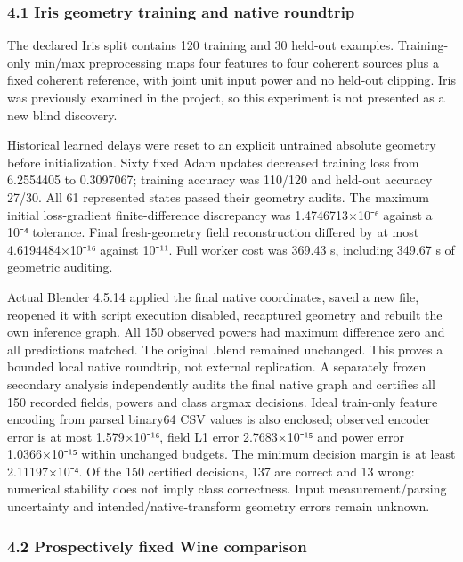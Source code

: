 \documentclass[
  10pt,
]{article}
\begin{document}
\hypertarget{iris-geometry-training-and-native-roundtrip}{%
\subsubsection{4.1 Iris geometry training and native
roundtrip}\label{iris-geometry-training-and-native-roundtrip}}

The declared Iris split contains 120 training and 30 held-out examples.
Training-only min/max preprocessing maps four features to four coherent
sources plus a fixed coherent reference, with joint unit input power and
no held-out clipping. Iris was previously examined in the project, so
this experiment is not presented as a new blind discovery.

Historical learned delays were reset to an explicit untrained absolute
geometry before initialization. Sixty fixed Adam updates decreased
training loss from 6.2554405 to 0.3097067; training accuracy was 110/120
and held-out accuracy 27/30. All 61 represented states passed their
geometry audits. The maximum initial loss-gradient finite-difference
discrepancy was 1.4746713×10⁻⁶ against a 10⁻⁴ tolerance. Final
fresh-geometry field reconstruction differed by at most 4.6194484×10⁻¹⁶
against 10⁻¹¹. Full worker cost was 369.43 s, including 349.67 s of
geometric auditing.

Actual Blender 4.5.14 applied the final native coordinates, saved a new
file, reopened it with script execution disabled, recaptured geometry
and rebuilt the own inference graph. All 150 observed powers had maximum
difference zero and all predictions matched. The original .blend
remained unchanged. This proves a bounded local native roundtrip, not
external replication. A separately frozen secondary analysis
independently audits the final native graph and certifies all 150
recorded fields, powers and class argmax decisions. Ideal train-only
feature encoding from parsed binary64 CSV values is also enclosed;
observed encoder error is at most 1.579×10⁻¹⁶, field L1 error
2.7683×10⁻¹⁵ and power error 1.0366×10⁻¹⁵ within unchanged budgets. The
minimum decision margin is at least 2.11197×10⁻⁴. Of the 150 certified
decisions, 137 are correct and 13 wrong: numerical stability does not
imply class correctness. Input measurement/parsing uncertainty and
intended/native-transform geometry errors remain unknown.

\hypertarget{prospectively-fixed-wine-comparison}{%
\subsubsection{4.2 Prospectively fixed Wine
comparison}\label{prospectively-fixed-wine-comparison}}
\end{document}

